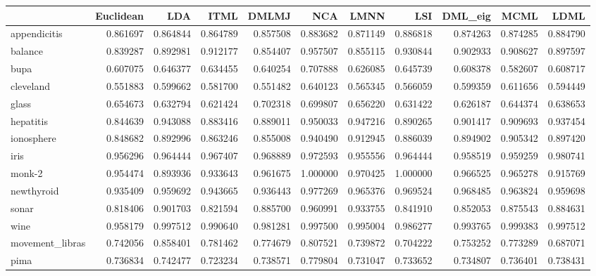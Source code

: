 \begin{tabular}{lrrrrrrrrrr}
\toprule
{} &  Euclidean &       LDA &      ITML &     DMLMJ &       NCA &      LMNN &       LSI &   DML\_eig &      MCML &      LDML \\
\midrule
appendicitis    &   0.861697 &  0.864844 &  0.864789 &  0.857508 &  0.883682 &  0.871149 &  0.886818 &  0.874263 &  0.874285 &  0.884790 \\
balance         &   0.839287 &  0.892981 &  0.912177 &  0.854407 &  0.957507 &  0.855115 &  0.930844 &  0.902933 &  0.908627 &  0.897597 \\
bupa            &   0.607075 &  0.646377 &  0.634455 &  0.640254 &  0.707888 &  0.626085 &  0.645739 &  0.608378 &  0.582607 &  0.608717 \\
cleveland       &   0.551883 &  0.599662 &  0.581700 &  0.551482 &  0.640123 &  0.565345 &  0.566059 &  0.599359 &  0.611656 &  0.594449 \\
glass           &   0.654673 &  0.632794 &  0.621424 &  0.702318 &  0.699807 &  0.656220 &  0.631422 &  0.626187 &  0.644374 &  0.638653 \\
hepatitis       &   0.844639 &  0.943088 &  0.883416 &  0.889011 &  0.950033 &  0.947216 &  0.890265 &  0.901417 &  0.909693 &  0.937454 \\
ionosphere      &   0.848682 &  0.892996 &  0.863246 &  0.855008 &  0.940490 &  0.912945 &  0.886039 &  0.894902 &  0.905342 &  0.897420 \\
iris            &   0.956296 &  0.964444 &  0.967407 &  0.968889 &  0.972593 &  0.955556 &  0.964444 &  0.958519 &  0.959259 &  0.980741 \\
monk-2          &   0.954474 &  0.893936 &  0.933643 &  0.961675 &  1.000000 &  0.970425 &  1.000000 &  0.966525 &  0.965278 &  0.915769 \\
newthyroid      &   0.935409 &  0.959692 &  0.943665 &  0.936443 &  0.977269 &  0.965376 &  0.969524 &  0.968485 &  0.963824 &  0.959698 \\
sonar           &   0.818406 &  0.901703 &  0.821594 &  0.885700 &  0.960991 &  0.933755 &  0.841910 &  0.852053 &  0.875543 &  0.884631 \\
wine            &   0.958179 &  0.997512 &  0.990640 &  0.981281 &  0.997500 &  0.995004 &  0.986277 &  0.993765 &  0.999383 &  0.997512 \\
movement\_libras &   0.742056 &  0.858401 &  0.781462 &  0.774679 &  0.807521 &  0.739872 &  0.704222 &  0.753252 &  0.773289 &  0.687071 \\
pima            &   0.736834 &  0.742477 &  0.723234 &  0.738571 &  0.779804 &  0.731047 &  0.733652 &  0.734807 &  0.736401 &  0.738431 \\

\end{tabular}
